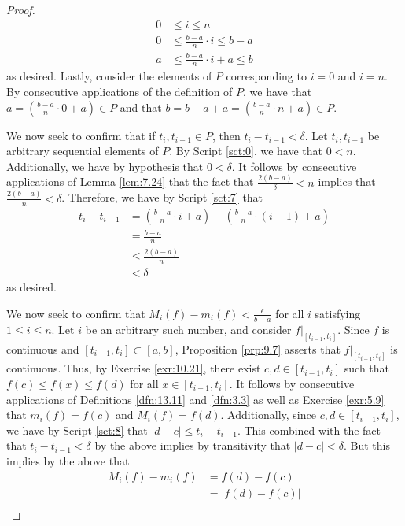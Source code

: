 \documentclass[../main.tex]{subfiles}
\begin{document}
\begin{theorem}
\begin{proof}
        \begin{align*}
            0 &\leq i \leq n\\
            0 &\leq \frac{b-a}{n}\cdot i \leq b-a\\
            a & \leq \frac{b-a}{n}\cdot i+a \leq b
        \end{align*}
        as desired. Lastly, consider the elements of $P$ corresponding to $i=0$ and $i=n$. By consecutive applications of the definition of $P$, we have that $a=(\frac{b-a}{n}\cdot 0+a)\in P$ and that $b=b-a+a=(\frac{b-a}{n}\cdot n+a)\in P$.\par
        We now seek to confirm that if $t_i,t_{i-1}\in P$, then $t_i-t_{i-1}<\delta$. Let $t_i,t_{i-1}$ be arbitrary sequential elements of $P$. By Script \ref{sct:0}, we have that $0<n$. Additionally, we have by hypothesis that $0<\delta$. It follows by consecutive applications of Lemma \ref{lem:7.24} that the fact that $\frac{2(b-a)}{\delta}<n$ implies that $\frac{2(b-a)}{n}<\delta$. Therefore, we have by Script \ref{sct:7} that
        \begin{align*}
            t_i-t_{i-1} &= \left( \frac{b-a}{n}\cdot i+a \right)-\left( \frac{b-a}{n}\cdot(i-1)+a \right)\\
            &= \frac{b-a}{n}\\
            &\leq \frac{2(b-a)}{n}\\
            &< \delta
        \end{align*}
        as desired.\par
        We now seek to confirm that $M_i(f)-m_i(f)<\frac{\epsilon}{b-a}$ for all $i$ satisfying $1\leq i\leq n$. Let $i$ be an arbitrary such number, and consider $f|_{[t_{i-1},t_i]}$. Since $f$ is continuous and $[t_{i-1},t_i]\subset[a,b]$, Proposition \ref{prp:9.7} asserts that $f|_{[t_{i-1},t_i]}$ is continuous. Thus, by Exercise \ref{exr:10.21}, there exist $c,d\in[t_{i-1},t_i]$ such that $f(c)\leq f(x)\leq f(d)$ for all $x\in[t_{i-1},t_i]$. It follows by consecutive applications of Definitions \ref{dfn:13.11} and \ref{dfn:3.3} as well as Exercise \ref{exr:5.9} that $m_i(f)=f(c)$ and $M_i(f)=f(d)$. Additionally, since $c,d\in[t_{i-1},t_i]$, we have by Script \ref{sct:8} that $|d-c|\leq t_i-t_{i-1}$. This combined with the fact that $t_i-t_{i-1}<\delta$ by the above implies by transitivity that $|d-c|<\delta$. But this implies by the above that
        \begin{align*}
            M_i(f)-m_i(f) &= f(d)-f(c)\\
            &= |f(d)-f(c)|\\

\end{align*}
\end{proof}
\end{theorem}
\end{document}
